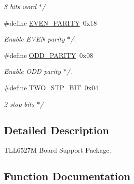 \begin{DoxyCompactItemize}
\begin{DoxyCompactList}\small\item\em 8 bits word $\ast$/ \end{DoxyCompactList}\item 
\mbox{\label{group__RTEMSBSPsBfinTLL6527M_ga30a963ff1432e4cfbdd83e74045ef142}} 
\#define \mbox{\hyperlink{group__RTEMSBSPsBfinTLL6527M_ga30a963ff1432e4cfbdd83e74045ef142}{E\+V\+E\+N\+\_\+\+P\+A\+R\+I\+TY}}~0x18
\begin{DoxyCompactList}\small\item\em Enable E\+V\+EN parity $\ast$/. \end{DoxyCompactList}\item 
\mbox{\label{group__RTEMSBSPsBfinTLL6527M_ga898d7631f24dd6b1deebf808a2214ea2}} 
\#define \mbox{\hyperlink{group__RTEMSBSPsBfinTLL6527M_ga898d7631f24dd6b1deebf808a2214ea2}{O\+D\+D\+\_\+\+P\+A\+R\+I\+TY}}~0x08
\begin{DoxyCompactList}\small\item\em Enable O\+DD parity $\ast$/. \end{DoxyCompactList}\item 
\mbox{\label{group__RTEMSBSPsBfinTLL6527M_gab03ed74bfd7b18c70fa22835d779997b}} 
\#define \mbox{\hyperlink{group__RTEMSBSPsBfinTLL6527M_gab03ed74bfd7b18c70fa22835d779997b}{T\+W\+O\+\_\+\+S\+T\+P\+\_\+\+B\+IT}}~0x04
\begin{DoxyCompactList}\small\item\em 2 stop bits $\ast$/ \end{DoxyCompactList}\end{DoxyCompactItemize}


\subsection{Detailed Description}
T\+L\+L6527M Board Support Package. 



\subsection{Function Documentation}
\mbox{\label{group__RTEMSBSPsBfinTLL6527M_gab3388042c56b34c40be81fd5f028d97e}} 
